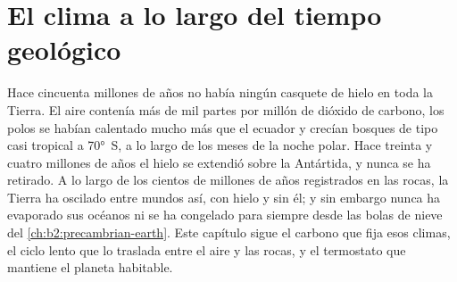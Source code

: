 \chapter{El clima a lo largo del tiempo geológico}\label{ch:b2:deep-time-climate}

Hace cincuenta millones de años no había ningún casquete de hielo en toda la Tierra. El aire contenía más de
mil partes por millón de dióxido de carbono, los polos se habían calentado mucho más que el ecuador y
crecían bosques de tipo casi tropical a \ang{70}~S, a lo largo de los meses de la noche polar. Hace treinta y cuatro
millones de años el hielo se extendió sobre la Antártida, y nunca se ha retirado. A lo largo de los cientos de millones
de años registrados en las rocas, la Tierra ha oscilado entre mundos así, con hielo y sin él; y sin embargo
nunca ha evaporado sus océanos ni se ha congelado para siempre desde las bolas de nieve del
\cref{ch:b2:precambrian-earth}. Este capítulo sigue el carbono que fija esos climas, el ciclo lento
que lo traslada entre el aire y las rocas, y el termostato que mantiene el planeta
habitable.

